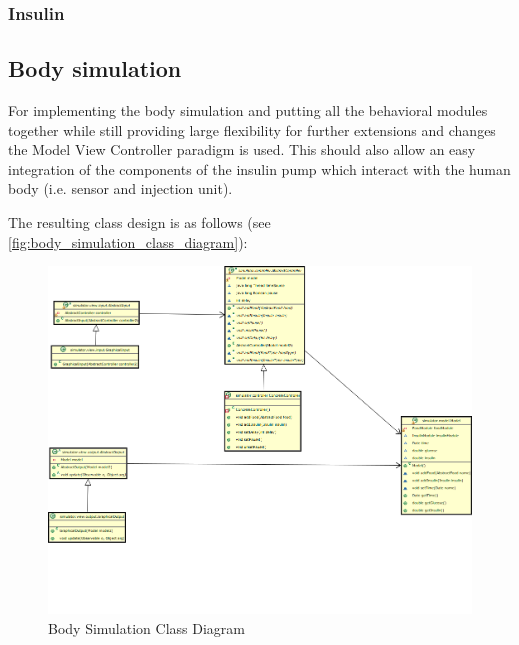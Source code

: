 \subsubsection{Insulin}

\newpage
\subsection{Body simulation}
For implementing the body simulation and putting all the behavioral modules
together while still providing large flexibility for further extensions and
changes the Model View Controller paradigm is used.
This should also allow an easy integration of the components of the insulin
pump which interact with the human body (i.e. sensor and injection unit).

The resulting class design is as follows  (see
\vref{fig:body_simulation_class_diagram}): 

\begin{figure}[htb]
\centering
\includegraphics[width=\textwidth]{images/body_simulation_classdiagram.png}
\caption{Body Simulation Class Diagram}
\label{fig:body_simulation_class_diagram}
\end{figure}
